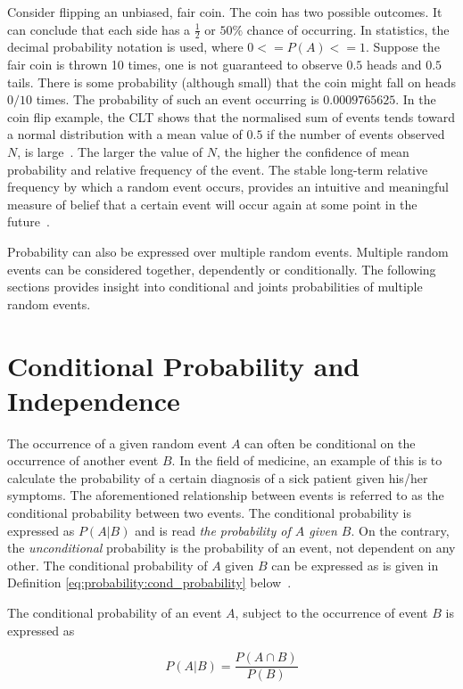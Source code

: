 Consider flipping an unbiased, fair coin. The coin has two possible outcomes. It can conclude that each side has a $\frac{1}{2}$ or $50\%$ chance of occurring. In statistics, the decimal probability notation is used, where $0 <= P(A) <= 1$. Suppose the fair coin is thrown 10 times, one is not guaranteed to observe $0.5$ heads and $0.5$ tails. There is some probability (although small) that the coin might fall on heads $0/10$ times. The probability of such an event occurring is $0.0009765625$. In the coin flip example, the \acf{CLT} shows that the normalised sum of events tends toward a normal distribution with a mean value of $0.5$ if the number of events observed $N$, is large~\cite{ref:wackerly:2014}. The larger the value of $N$, the higher the confidence of mean probability and relative frequency of the event. The stable long-term relative frequency by which a random event occurs, provides an intuitive and meaningful measure of belief that a certain event will occur again at some point in the future~\cite{ref:wackerly:2014}.

Probability can also be expressed over multiple random events. Multiple random events can be considered together, dependently or conditionally. The following sections provides insight into conditional and joints probabilities of multiple random events.

\section{Conditional Probability and Independence}\label{sec:probability:cond_probability}

The occurrence of a given random event $A$ can often be conditional on the occurrence of another event $B$. In the field of medicine, an example of this is to calculate the probability of a certain diagnosis of a sick patient given his/her symptoms. The aforementioned relationship between events is referred to as the conditional probability between two events. The conditional probability is expressed as $P(A \vert B)$ and is read \textit{the probability of $A$ given $B$}. On the contrary, the \textit{unconditional} probability is the probability of an event, not dependent on any other. The conditional probability of $A$ given $B$ can be expressed as is given in Definition \ref{eq:probability:cond_probability} below~\cite{ref:wackerly:2014}.
\\
\begin{definition}
      \label{eq:probability:cond_probability}
      The conditional probability of an event $A$, subject to the occurrence of event $B$ is expressed as

      \begin{equation}
            \label{eq:probability:overview:conditional}
            P(A \vert B) = \frac{P(A \cap B)}{P(B)}
      \end{equation}
\end{definition}

